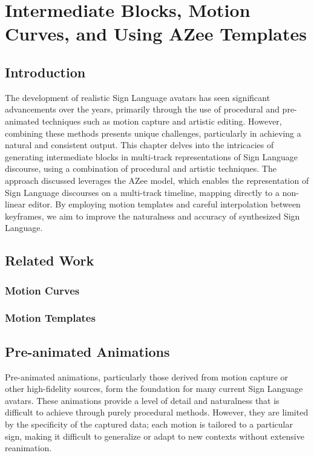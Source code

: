 \documentclass[../../main.tex]{subfiles}
\begin{document}
\chapter{Intermediate Blocks, Motion Curves, and Using AZee Templates}
\label{ch:intermediate_blocks}

\section{Introduction}

The development of realistic Sign Language avatars has seen significant advancements over the years, primarily through the use of procedural and pre-animated techniques such as motion capture and artistic editing. However, combining these methods presents unique challenges, particularly in achieving a natural and consistent output. This chapter delves into the intricacies of generating intermediate blocks in multi-track representations of Sign Language discourse, using a combination of procedural and artistic techniques. The approach discussed leverages the AZee model, which enables the representation of Sign Language discourses on a multi-track timeline, mapping directly to a non-linear editor. By employing motion templates and careful interpolation between keyframes, we aim to improve the naturalness and accuracy of synthesized Sign Language.


\section{Related Work}

\subsection{Motion Curves}

\subsection{Motion Templates}

\section{Pre-animated Animations}

Pre-animated animations, particularly those derived from motion capture or other high-fidelity sources, form the foundation for many current Sign Language avatars. These animations provide a level of detail and naturalness that is difficult to achieve through purely procedural methods. However, they are limited by the specificity of the captured data; each motion is tailored to a particular sign, making it difficult to generalize or adapt to new contexts without extensive reanimation.
\end{document}
